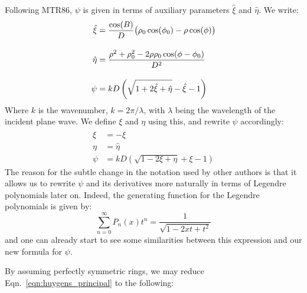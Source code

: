 \documentclass{article}
\begin{document}
        Following MTR86, $\psi$ is given in terms of auxiliary parameters
        $\hat{\xi}$ and $\hat{\eta}$. We write:
        \begin{align}
            \hat{\xi}
            &=\frac{\cos(B)}{D}\big(
                \rho_{0}\cos(\phi_{0})-\rho\cos(\phi)
            \big)\\[1em]
            \hat{\eta}
            &=\frac{%
                \rho^{2}+\rho_{0}^{2}-2\rho\rho_{0}\cos(\phi-\phi_{0})%
            }{D^{2}}\\[1em]
            \psi
            &=kD\left(
                \sqrt{1+2\hat{\xi}+\hat{\eta}}-\hat{\xi}-1
            \right)
        \end{align}
        Where $k$ is the wavenumber, $k=2\pi/\lambda$, with $\lambda$ being
        the wavelength of the incident plane wave.
        We define $\xi$ and $\eta$ using this, and rewrite $\psi$ accordingly:
        \begin{align}
            \xi&=-\hat{\xi}\\
            \eta&=\hat{\eta}\\
            \label{eqn:fresnel_kernel_psi}
            \psi&=kD\left(
                \sqrt{1-2\xi+\eta}+\xi-1
            \right)
        \end{align}
        The reason for the subtle change in the notation used by other
        authors is that it allows us to rewrite $\psi$ and its derivatives
        more naturally in terms of Legendre polynomials later on. Indeed,
        the generating function for the Legendre polynomials is given by:
        \begin{equation}
            \sum_{n=0}^{\infty}P_{n}(x)t^{n}
            =\frac{1}{\sqrt{1-2xt+t^{2}}}
        \end{equation}
        and one can already start to see some similarities between this
        expression and our new formula for $\psi$.
        \par\hfill\par
        By assuming perfectly symmetric rings, we may reduce
        Eqn.~\ref{eqn:huygens_principal} to the following:
\end{document}

